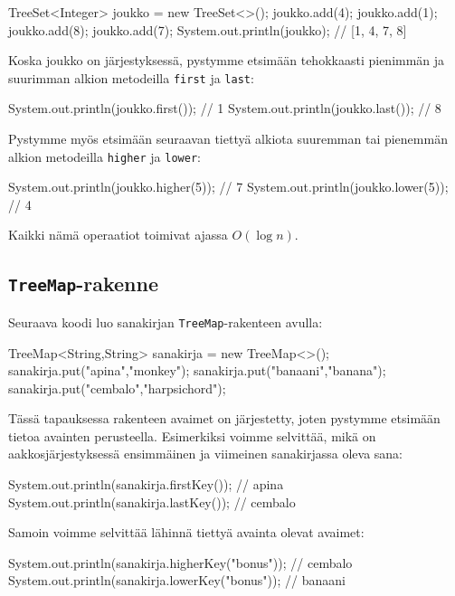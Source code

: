 \begin{code}
TreeSet<Integer> joukko = new TreeSet<>();
joukko.add(4);
joukko.add(1);
joukko.add(8);
joukko.add(7);
System.out.println(joukko); // [1, 4, 7, 8]
\end{code}

Koska joukko on järjestyksessä, pystymme etsimään tehokkaasti
pienim\-män ja suurimman alkion metodeilla \texttt{first} ja \texttt{last}:

\begin{code}
System.out.println(joukko.first()); // 1
System.out.println(joukko.last()); // 8
\end{code}

Pystymme myös etsimään seuraavan tiettyä alkiota
suuremman tai pienemmän alkion metodeilla \texttt{higher} ja \texttt{lower}:

\begin{code}
System.out.println(joukko.higher(5)); // 7
System.out.println(joukko.lower(5)); // 4
\end{code}

Kaikki nämä operaatiot toimivat ajassa $O(\log n)$.

\subsection{\texttt{TreeMap}-rakenne}

Seuraava koodi luo sanakirjan \texttt{TreeMap}-rakenteen avulla:

\begin{code}
TreeMap<String,String> sanakirja = new TreeMap<>();
sanakirja.put("apina","monkey");
sanakirja.put("banaani","banana");
sanakirja.put("cembalo","harpsichord");
\end{code}

Tässä tapauksessa rakenteen avaimet on järjestetty,
joten pystymme etsimään tietoa avainten perusteella.
Esimerkiksi voimme selvittää, mikä on aakkosjärjestyksessä
ensimmäinen ja viimeinen sanakirjassa oleva sana:

\begin{code}
System.out.println(sanakirja.firstKey()); // apina
System.out.println(sanakirja.lastKey()); // cembalo
\end{code}

Samoin voimme selvittää lähinnä tiettyä avainta olevat avaimet:

\begin{code}
System.out.println(sanakirja.higherKey("bonus")); // cembalo
System.out.println(sanakirja.lowerKey("bonus")); // banaani
\end{code}

